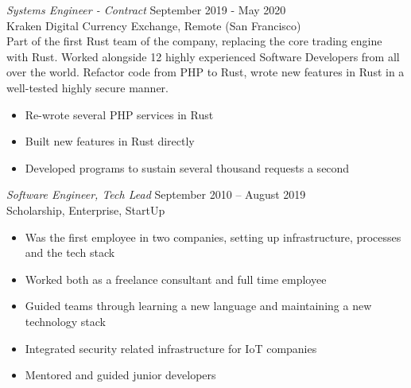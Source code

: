 \documentclass[10pt]{res} %
\begin{document}
\begin{resume}
{\sl Systems Engineer - Contract} \hfill September 2019 - May 2020 \\
Kraken Digital Currency Exchange, Remote (San Francisco)\\
Part of the first Rust team of the company, replacing the core trading engine with Rust. Worked alongside 12 highly experienced Software Developers from all over the world. Refactor code from PHP to Rust, wrote new features in Rust in a well-tested highly secure manner.
\begin{itemize}
	\item Re-wrote several PHP services in Rust
	\item Built new features in Rust directly
	\item Developed programs to sustain several thousand requests a second
\end{itemize}

{\sl Software Engineer, Tech Lead} \hfill September 2010 -- August 2019 \\
Scholarship, Enterprise, StartUp\\

\begin{itemize}
	\item Was the first employee in two companies, setting up infrastructure, processes and the tech stack
	\item Worked both as a freelance consultant and full time employee
	\item Guided teams through learning a new language and maintaining a new technology stack
	\item Integrated security related infrastructure for IoT companies
	\item Mentored and guided junior developers
\end{itemize}


\end{resume} 
\end{document}

